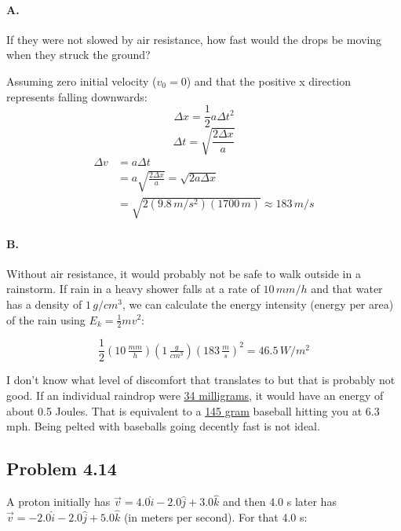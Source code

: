 \documentclass[12pt]{article}
\begin{document}
\paragraph{A.} If they were not slowed by air resistance, how fast would the drops be moving when they struck the ground? \newline

Assuming zero initial velocity ($v_0 = 0$) and that the positive x direction represents falling downwards:
\[
\Delta x = \frac{1}{2} a \Delta t^2
\]
\[
\Delta t = \sqrt{\frac{2 \Delta x}{a}}
\]
\begin{align*}
\Delta v &= a \Delta t 
\\&= a \sqrt{\frac{2 \Delta x}{a}} =  \sqrt{2 a \Delta x}
\\&=\sqrt{2 (9.8\,\si{m/s^2}) (1700\,\si{m})} \approx \boxed{183\,\si{m/s}}
\end{align*}

\paragraph{B.} Without air resistance, it would probably not be safe to walk outside in a rainstorm. If rain in a heavy shower falls at a rate of \href{https://water.usgs.gov/edu/activity-howmuchrain-metric.html}{$10\,\si{mm/h}$} and that water has a density of $1\,\si{g/cm^3}$, we can calculate the energy intensity (energy per area) of the rain using $E_k = \frac{1}{2} m v^2$:

\[
\frac{1}{2} (10\,\si{\tfrac{mm}{h}})(1\,\si{\tfrac{g}{cm^3}})(183\,\si{\tfrac{m}{s}})^2 = 46.5\,\si{W/m^2}
\]

I don't know what level of discomfort that translates to but that is probably not good. If an individual raindrop were \href{https://www.wolframalpha.com/input?i=mass+of+raindrop&assumption=%7B%22F%22%2C+%22RaindropProperties%22%2C+%22d%22%7D+-%3E%224+mm%22}{34 milligrams}, it would have an energy of about 0.5 Joules. That is equivalent to a \href{https://www.wolframalpha.com/input?i=mass+of+baseball}{145 gram} baseball hitting you at 6.3 mph. Being pelted with baseballs going decently fast is not ideal.

\subsection{Problem 4.14}
A proton initially has $\vec{v} = 4.0 \hat{i} - 2.0\hat{j} + 3.0\hat{k}$ and then 4.0 s later has $\vec{v} = -2.0\hat{i}-2.0\hat{j}+5.0\hat{k}$ (in meters per second). For that 4.0 s:
\end{document}
